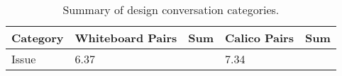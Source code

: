 \begin{table}
\centering
\caption{Summary of design conversation categories.}
\begin{tabular}{ p{3.5cm}p{1.5cm}p{1.5cm}p{1.5cm}p{1.5cm} }
\toprule
Category & Whiteboard Pairs & Sum & Calico Pairs & Sum \\
\midrule
Issue 		& 6.37		&	& 7.34 		&  \\
\bottomrule
\end{tabular}
\label{table:2}
\end{table}	

